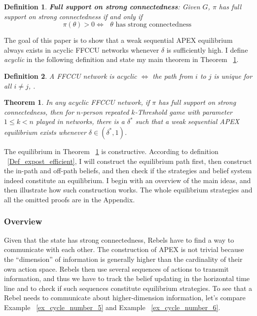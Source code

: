 \documentclass[12pt,letterpaper]{article}
\newtheorem*{main result}{Main Result}
\newtheorem{theorem}{Theorem}
\newtheorem{definition}{Definition}[section]
\theoremstyle{definition}
\theoremstyle{remark}
\theoremstyle{claim}
\begin{document}
\begin{definition}
\textbf{Full support on strong connectedness}: Given $G$, $\pi$ has full support on strong connectedness if and only if 
\[\pi(\theta)>0\Leftrightarrow \text{ $\theta$ has strong connectedness }\] 
\end{definition}  


The goal of this paper is to show that a weak sequential APEX equilibrium always exists in acyclic FFCCU networks whenever $\delta$ is sufficiently high. I define \textit{acyclic} in the following definition and state my main theorem in Theorem ~\ref{thm_main_result}. 
\begin{definition}
A FFCCU network is acyclic $\Leftrightarrow$ the path from $i$ to $j$ is unique for all $i\neq j$, . 
\end{definition}

\begin{theorem}
\label{thm_main_result}
In any acyclic FFCCU network, if $\pi$ has full support on strong connectedness, then for $n$-person repeated $k$-Threshold game with parameter $1\leq k < n$ played in networks, there is a $\delta^{*}$ such that a weak sequential APEX equilibrium exists whenever $\delta\in(\delta^{*},1)$.
\end{theorem}

The equilibrium in Theorem ~\ref{thm_main_result} is constructive. According to definition ~\ref{Def_expost_efficient}, I will construct the equilibrium path first, then construct the in-path and off-path beliefs, and then check if the strategies and belief system indeed constitute an equilibrium. I begin with an overview of the main ideas, and then illustrate how such construction works. The whole equilibrium strategies and all the omitted proofs are in the Appendix.  

\subsubsection{Overview}

Given that the state has strong connectedness, Rebels have to find a way to communicate with each other. The construction of APEX is not trivial because the ``dimension'' of information is generally higher than the cardinality of their own action space. Rebels then use several sequences of actions to transmit information, and thus we have to track the belief updating in the horizontal time line and to check if such sequences constitute equilibrium strategies. To see that a Rebel needs to communicate about higher-dimension information, let's compare Example ~\ref{ex_cycle_number_5} and Example ~\ref{ex_cycle_number_6}.
\end{document}

